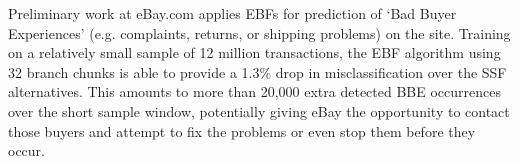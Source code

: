 \documentclass{article}
\begin{document}
Preliminary work at eBay.com applies EBFs for prediction of `Bad Buyer Experiences' (e.g. complaints, returns, or shipping problems) on the site.  Training on a relatively small sample of 12 million transactions, the EBF algorithm using 32 branch chunks is able to provide a 1.3\% drop in misclassification over the SSF alternatives.  This amounts to more than 20,000 extra detected BBE occurrences over the short sample window, potentially giving eBay the opportunity to contact those buyers and attempt to fix the problems or even stop them before they occur.



\end{document}
